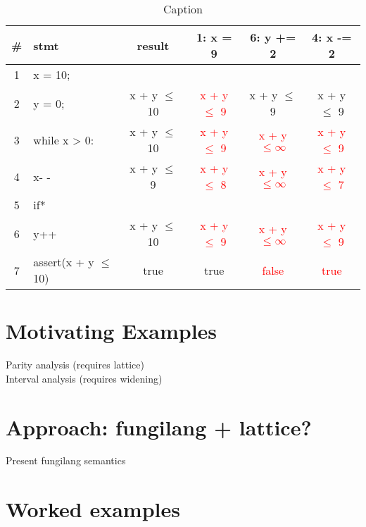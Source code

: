 \documentclass[acmlarge,anonymous]{acmart}\settopmatter{printfolios=true}
\begin{document}
\begin{table}[]
    \centering
    \begin{tabular}{|c|l|c|c|c|c|}
        \hline
        \# & stmt & result & 1: x = 9 & 6: y += 2 & 4: x -= 2 \\
        \hline
        1 & x = 10; & & & &\\
        \hline
        2 & y = 0; & x + y $\le$ 10 & \textcolor{red}{x + y $\le$ 9} & x + y $\le$ 9 & x + y $\le$ 9\\
        \hline
        3 & while x > 0: & x + y $\le$ 10 & \textcolor{red}{x + y $\le$ 9} & \textcolor{red}{x + y $\le \infty$} & \textcolor{red}{x + y $\le$ 9}\\
        \hline
        4 & \hspace*{0.3cm} x- - & x + y $\le$ 9 & \textcolor{red}{x + y $\le$ 8} & \textcolor{red}{x + y $\le \infty$} & \textcolor{red}{x + y $\le$ 7}\\
        \hline
        5 & \hspace*{0.3cm} if* & & & &\\
        \hline
        6 & \hspace*{0.6cm} y++ & x + y $\le$ 10 & \textcolor{red}{x + y $\le$ 9} & \textcolor{red}{x + y $\le \infty$} & \textcolor{red}{x + y $\le$ 9}\\
        \hline
        7 & assert(x + y $\le$ 10) & true & true & \textcolor{red}{false} & \textcolor{red}{true}\\
        \hline
    \end{tabular}
    \caption{Caption}
    \label{tab:my_label}
\end{table}

\section{Motivating Examples}

Parity analysis (requires lattice)\\
Interval analysis (requires widening)

\section{Approach: fungilang + lattice?}

Present fungilang semantics

\section{Worked examples}
\end{document}
